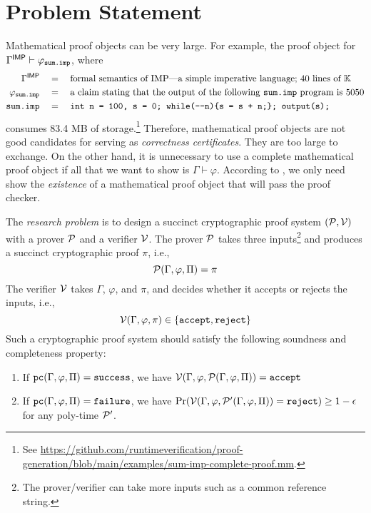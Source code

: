 \documentclass{article}
\begin{document}
\section{Problem Statement}
\label{sec:crypto_proofs}

Mathematical proof objects can be very large.
For example, the proof object for
$\Gamma^{\mathsf{IMP}} \vdash \varphi_{\textnormal{\texttt{sum.imp}}}$,
where
\begin{align}
\GammaIMP &\quad=\quad
\text{formal semantics of IMP---a simple imperative language; 40 lines of \K}
\\
\varphisum &\quad=\quad
\text{a claim stating that the output of the following \cdsum program is 5050}
\\
\cdsum &\quad=\quad
\code{int n = 100, s = 0; while(-{}-n)\{s = s + n;\}; output(s);}
\end{align}
consumes 83.4 MB of storage.\footnote{See \url{https://github.com/runtimeverification/proof-generation/blob/main/examples/sum-imp-complete-proof.mm}.}
Therefore, mathematical proof objects are not good candidates for
serving as \emph{correctness certificates}.
They are too large to exchange.
On the other hand,
it is unnecessary to use a complete mathematical proof object
if all that we want to show is $\Gamma \vdash \varphi$.
According to ,
we only need show the \emph{existence} of a mathematical proof object
that will pass the proof checker.

The \emph{research problem} is to
design a succinct cryptographic proof system
$(\mathcal{P},\mathcal{V})$
with a prover $\mathcal{P}$ and a verifier $\mathcal{V}$.
The prover $\mathcal{P}$ takes three inputs\footnote{The prover/verifier can take more inputs such as a common reference string.}
and produces a succinct cryptographic proof $\pi$, i.e.,
\begin{equation}
\mathcal{P}(\Gamma, \varphi, \Pi) = \pi
\end{equation}
The verifier $\mathcal{V}$ takes $\Gamma$, $\varphi$, and $\pi$,
and decides whether it accepts or rejects the inputs, i.e.,
\begin{equation}
\mathcal{V}(\Gamma, \varphi, \pi) \in \{\textnormal{\texttt{accept}}, \textnormal{\texttt{reject}}\}
\end{equation}
Such a cryptographic proof system should satisfy the following soundness and completeness property:
\begin{enumerate}
\item If $\textnormal{\texttt{pc}}(\Gamma,\varphi,\Pi) = \textnormal{\texttt{success}}$, we have $\mathcal{V}(\Gamma,\varphi,\mathcal{P}(\Gamma, \varphi, \Pi)) = \textnormal{\texttt{accept}}$
\item If $\textnormal{\texttt{pc}}(\Gamma,\varphi,\Pi) = \textnormal{\texttt{failure}}$, we have
$\Pr(\mathcal{V}(\Gamma, \varphi, \mathcal{P}'(\Gamma, \varphi, \Pi)) = \textnormal{\texttt{reject}}) \ge 1-\epsilon$
for any poly-time $\mathcal{P}'$.
\end{enumerate}
\end{document}
